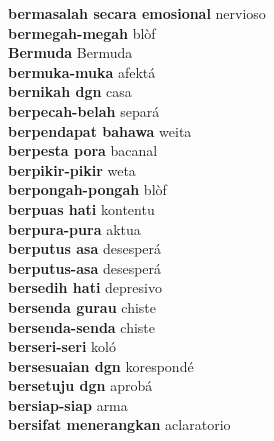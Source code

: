 \textbf{ bermasalah secara emosional  } nervioso \\
\textbf{ bermegah-megah  } blòf \\
\textbf{ Bermuda  } Bermuda \\
\textbf{ bermuka-muka  } afektá \\
\textbf{ bernikah dgn  } casa \\
\textbf{ berpecah-belah  } separá \\
\textbf{ berpendapat bahawa  } weita \\
\textbf{ berpesta pora  } bacanal \\
\textbf{ berpikir-pikir  } weta \\
\textbf{ berpongah-pongah  } blòf \\
\textbf{ berpuas hati  } kontentu \\
\textbf{ berpura-pura  } aktua \\
\textbf{ berputus asa  } desesperá \\
\textbf{ berputus-asa  } desesperá \\
\textbf{ bersedih hati  } depresivo \\
\textbf{ bersenda gurau  } chiste \\
\textbf{ bersenda-senda  } chiste \\
\textbf{ berseri-seri  } koló \\
\textbf{ bersesuaian dgn  } korespondé \\
\textbf{ bersetuju dgn  } aprobá \\
\textbf{ bersiap-siap  } arma \\
\textbf{ bersifat menerangkan  } aclaratorio \\
